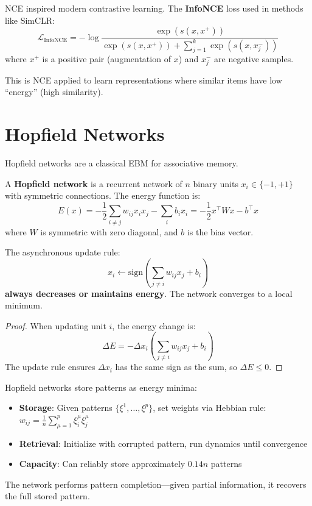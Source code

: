 \begin{remark}
    NCE inspired modern contrastive learning. The \textbf{InfoNCE} loss used in methods like SimCLR:
    \[
        \mathcal{L}_{\text{InfoNCE}} = -\log \frac{\exp(s(x, x^+))}{\exp(s(x, x^+)) + \sum_{j=1}^{k} \exp(s(x, x_j^-))}
    \]
    where $x^+$ is a positive pair (augmentation of $x$) and $x_j^-$ are negative samples.

    This is NCE applied to learn representations where similar items have low ``energy'' (high similarity).
\end{remark}

\section{Hopfield Networks}

Hopfield networks are a classical EBM for associative memory.

\begin{definition}
    A \textbf{Hopfield network} is a recurrent network of $n$ binary units $x_i \in \{-1, +1\}$ with symmetric connections. The energy function is:
    \[
        E(x) = -\frac{1}{2} \sum_{i \neq j} w_{ij} x_i x_j - \sum_i b_i x_i = -\frac{1}{2} x^\top W x - b^\top x
    \]
    where $W$ is symmetric with zero diagonal, and $b$ is the bias vector.
\end{definition}

\begin{theorem}
    The asynchronous update rule:
    \[
        x_i \leftarrow \text{sign}\left( \sum_{j \neq i} w_{ij} x_j + b_i \right)
    \]
    \textbf{always decreases or maintains energy}. The network converges to a local minimum.

    \begin{proof}
        When updating unit $i$, the energy change is:
        \[
            \Delta E = -\Delta x_i \left( \sum_{j \neq i} w_{ij} x_j + b_i \right)
        \]
        The update rule ensures $\Delta x_i$ has the same sign as the sum, so $\Delta E \leq 0$.
    \end{proof}
\end{theorem}

\begin{remark}
    Hopfield networks store patterns as energy minima:
    \begin{itemize}
        \item \textbf{Storage}: Given patterns $\{\xi^1, \ldots, \xi^p\}$, set weights via Hebbian rule: $w_{ij} = \frac{1}{n} \sum_{\mu=1}^{p} \xi_i^\mu \xi_j^\mu$
        \item \textbf{Retrieval}: Initialize with corrupted pattern, run dynamics until convergence
        \item \textbf{Capacity}: Can reliably store approximately $0.14n$ patterns
    \end{itemize}
    The network performs pattern completion---given partial information, it recovers the full stored pattern.
\end{remark}

